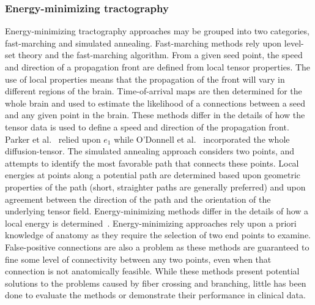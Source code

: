 \subsubsection{Energy-minimizing tractography}
Energy-minimizing tractography approaches may be grouped into two categories, fast-marching and simulated annealing. Fast-marching methods rely upon level-set theory and the fast-marching algorithm. From a given seed point, the speed and direction of a propagation front are defined from local tensor properties. The use of local properties means that the propagation of the front will vary in different regions of the brain. Time-of-arrival maps are then determined for the whole brain and used to estimate the likelihood of a connections between a seed and any given point in the brain. These methods differ in the details of how the tensor data is used to define a speed and direction of the propagation front. Parker et al.\ \cite{Parker2002a} relied upon $e_1$ while O'Donnell et al.\ \cite{ODonnell2002} incorporated the whole diffusion-tensor. The simulated annealing approach considers two points, and attempts to identify the most favorable path that connects these points. Local energies at points along a potential path are determined based upon geometric properties of the path (short, straighter paths are generally preferred) and upon agreement between the direction of the path and the orientation of the underlying tensor field. Energy-minimizing methods differ in the details of how a local energy is determined~\cite{Tuch2000,Tuch2001}. Energy-minimizing approaches rely upon a priori knowledge of anatomy as they require the selection of two end points to examine. False-positive connections are also a problem as these methods are guaranteed to fine some level of connectivity between any two points, even when that connection is not anatomically feasible. While these methods present potential solutions to the problems caused by fiber crossing and branching, little has been done to evaluate the methods or demonstrate their performance in clinical data.

